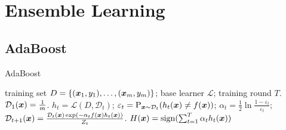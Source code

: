 \section{Ensemble Learning}

\subsection{AdaBoost}

\begin{algorithm}
    \caption{AdaBoost}\label{AdaBoost}
    \begin{algorithmic}[1]
        \Require training set $D = \{(\boldsymbol{x}_1, y_1), \ldots, (\boldsymbol{x}_m, y_m)\}$; base learner $\mathcal{L}$;
        training round $T$.
        \State $\mathcal{D}_1(\boldsymbol{x}) = \frac{1}{m}$.
            \State $h_t = \mathcal{L}(D, \mathcal{D}_t)$;
            \State $\varepsilon_t = \operatorname*{P}_{\boldsymbol{x}\sim\mathcal{D}_t}(h_t(\boldsymbol{x})\neq f(\boldsymbol{x}))$;
            \State $\alpha_t = \frac{1}{2}\ln{\frac{1 - \varepsilon_t}{\varepsilon_t}}$;
            \State $\mathcal{D}_{t + 1}(\boldsymbol{x}) = \frac{\mathcal{D}_t(\boldsymbol{x})\exp(-\alpha_t f(\boldsymbol{x})h_t(\boldsymbol{x}))}
            {Z_t}$.
        \EndFor
        \Ensure $H(\boldsymbol{x}) = \operatorname{sign}(\sum_{t = 1}^T \alpha_t h_t(\boldsymbol{x}))$
    \end{algorithmic}
\end{algorithm}